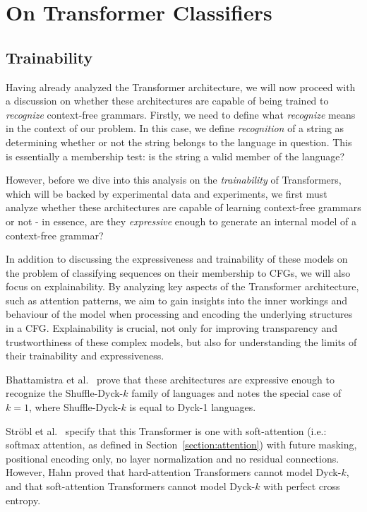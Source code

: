 \chapter{On Transformer Classifiers} \label{chapter:4}
\section{Trainability}

Having already analyzed the Transformer architecture, we will now proceed with a discussion on whether these architectures are
capable of being trained to \emph{recognize} context-free grammars. Firstly, we need to define what \emph{recognize} means in the context of our problem. In this case, we define \emph{recognition} of a string as determining whether or not the string belongs to the language in question. This is essentially a membership test: is the string a valid member of the language?

However, before we dive into this analysis on the \emph{trainability} of Transformers, which will be backed by experimental data and experiments, we
first must analyze whether these architectures are capable of learning context-free grammars or not - in essence,
are they \emph{expressive} enough to generate an internal model of a context-free grammar?

In addition to discussing the expressiveness and trainability of these models on the problem of classifying sequences on their membership to CFGs, we will also focus on explainability. By analyzing key aspects of the Transformer architecture, such as attention patterns, we aim to gain insights into the inner workings and behaviour of the model when processing and encoding the underlying structures in a CFG. Explainability is crucial, not only for improving transparency and trustworthiness of these complex models, but also for understanding the limits of their trainability and expressiveness.

Bhattamistra et al.~\cite{bhattamistra-transformers-formal-languages} prove that these architectures are expressive enough to recognize
the Shuffle-Dyck-$k$ family of languages and notes the special case of $k=1$, where Shuffle-Dyck-$k$ is equal to Dyck-1 languages.

Ströbl et al.~\cite{strobl2024formal} specify that this Transformer is one with soft-attention
(i.e.: softmax attention, as defined in Section~\ref{section:attention}) with future masking, positional encoding only, no layer normalization and no residual connections.
However, Hahn \cite{hahn-transformer} proved that hard-attention Transformers cannot model Dyck-$k$, and that soft-attention Transformers cannot model Dyck-$k$ with perfect cross entropy.

